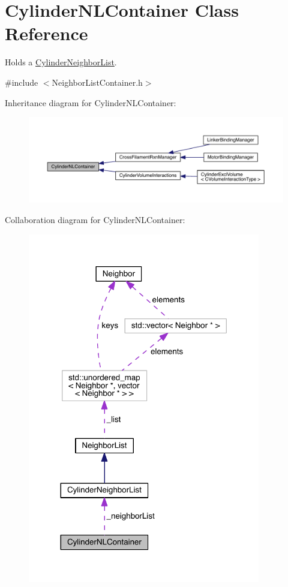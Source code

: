 \hypertarget{classCylinderNLContainer}{\section{Cylinder\+N\+L\+Container Class Reference}
\label{classCylinderNLContainer}
}


Holds a \hyperlink{classCylinderNeighborList}{Cylinder\+Neighbor\+List}.  




{\ttfamily \#include $<$Neighbor\+List\+Container.\+h$>$}



Inheritance diagram for Cylinder\+N\+L\+Container\+:
\nopagebreak
\begin{figure}[H]
\begin{center}
\leavevmode
\includegraphics[width=350pt]{classCylinderNLContainer__inherit__graph}
\end{center}
\end{figure}


Collaboration diagram for Cylinder\+N\+L\+Container\+:\nopagebreak
\begin{figure}[H]
\begin{center}
\leavevmode
\includegraphics[width=287pt]{classCylinderNLContainer__coll__graph}
\end{center}
\end{figure}
